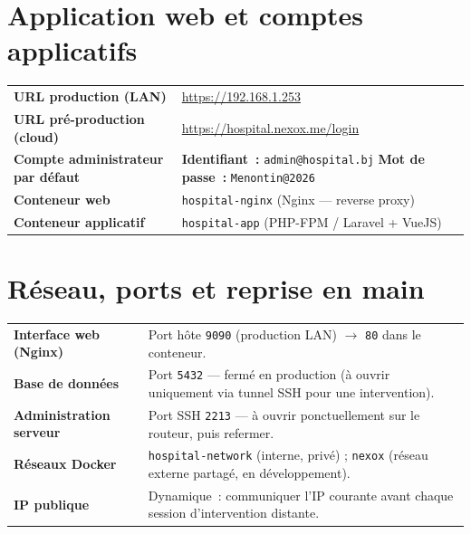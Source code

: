 \documentclass[11pt,a4paper]{article}
\newcommand{\fiche}[2]{%
  \par\smallskip
  \begin{tabularx}{\textwidth}{|>{\raggedright\arraybackslash}p{5.4cm}|>{\raggedright\arraybackslash}X|}
  \hline
  \rowcolor{headbg}\multicolumn{2}{|l|}{\textbf{\textcolor{white}{#1}}}\\\hline
  #2
  \hline
  \end{tabularx}\par\smallskip
}
\newcommand{\code}[1]{\texttt{#1}}
\begin{document}
\section{Application web et comptes applicatifs}
\fiche{Accès à l'application}{
  \textbf{URL production (LAN)} & \url{https://192.168.1.253} \\\hline
  \textbf{URL pré-production (cloud)} & \url{https://hospital.nexox.me/login} \\\hline
  \textbf{Compte administrateur par défaut} & \textbf{Identifiant~:} \code{admin@hospital.bj} \newline \textbf{Mot de passe~:} \code{Menontin@2026} \newline {\small\color{greytext}(compte initial — à personnaliser et sécuriser dès la mise en service)} \\\hline
  \textbf{Conteneur web} & \code{hospital-nginx} (Nginx — reverse proxy) \\\hline
  \textbf{Conteneur applicatif} & \code{hospital-app} (PHP-FPM / Laravel + VueJS) \\
}

\section{Réseau, ports et reprise en main}
\fiche{Ports \& réseau Docker}{
  \textbf{Interface web (Nginx)} & Port hôte \code{9090} (production LAN) $\rightarrow$ \code{80} dans le conteneur. \newline {\small\color{greytext}Réglable via \code{APP\_PORT} (\code{.env.production}, défaut \code{8080}).}\\\hline
  \textbf{Base de données} & Port \code{5432} — fermé en production (à ouvrir uniquement via tunnel SSH pour une intervention). \\\hline
  \textbf{Administration serveur} & Port SSH \code{2213} — à ouvrir ponctuellement sur le routeur, puis refermer. \\\hline
  \textbf{Réseaux Docker} & \code{hospital-network} (interne, privé) ; \code{nexox} (réseau externe partagé, en développement). \\\hline
  \textbf{IP publique} & Dynamique~: communiquer l'IP courante avant chaque session d'intervention distante. \\
}
\end{document}
